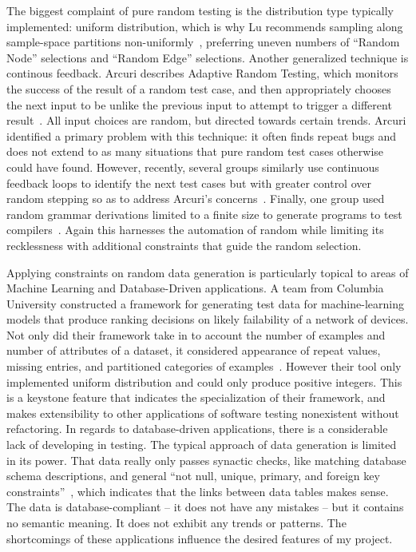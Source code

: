 The biggest complaint of pure random testing is the distribution type typically implemented: uniform distribution, which is why Lu recommends sampling along sample-space partitions non-uniformly~\cite{Lu:2018:URS:3184558.3186240}, preferring uneven numbers of ``Random Node'' selections and ``Random Edge'' selections. Another generalized technique is continous feedback. Arcuri describes Adaptive Random Testing, which monitors the success of the result of a random test case, and then appropriately chooses the next input to be unlike the previous input to attempt to trigger a different result~\cite{Arcuri:2011:ART:2001420.2001452}. All input choices are random, but directed towards certain trends. Arcuri identified a primary problem with this technique: it often finds repeat bugs and does not extend to as many situations that pure random test cases otherwise could have found. However, recently, several groups similarly use continuous feedback loops to identify the next test cases but with greater control over random stepping so as to address Arcuri's concerns~\cite{Yatoh:2015:FRT:2771783.2771805,Hughes:2016:FMB:2896921.2896928,Sabor:2015:ART:2819261.2819271}. Finally, one group used random grammar derivations limited to a finite size to generate programs to test compilers~\cite{Palka:2011:TOC:1982595.1982615}. Again this harnesses the automation of random while limiting its recklessness with additional constraints that guide the random selection.

Applying constraints on random data generation is particularly topical to areas of Machine Learning and Database-Driven applications. A team from Columbia University constructed a framework for generating test data for machine-learning models that produce ranking decisions on likely failability of a network of devices. Not only did their framework take in to account the number of examples and number of attributes of a dataset, it considered appearance of repeat values, missing entries, and partitioned categories of examples~\cite{Murphy:2007:PRT:1292414.1292425,Murphy:Kaiser}. However their tool only implemented uniform distribution and could only produce positive integers. This is a keystone feature that indicates the specialization of their framework, and makes extensibility to other applications of software testing nonexistent without refactoring. In regards to database-driven applications, there is a considerable lack of developing in testing. The typical approach of data generation is limited in its power. That data really only passes synactic checks, like matching database schema descriptions, and general ``not null, unique, primary, and foreign key constraints''~\cite{Haller:2010:TDC:1838126.1838132}, which indicates that the links between data tables makes sense. The data is database-compliant -- it does not have any mistakes -- but it contains no semantic meaning. It does not exhibit any trends or patterns. The shortcomings of these applications influence the desired features of my project.

